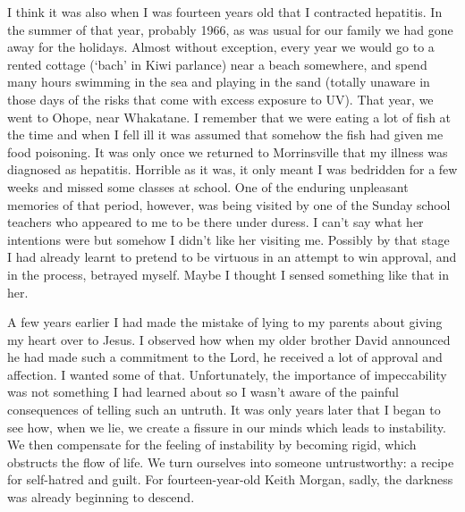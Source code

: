 \enlargethispage*{\baselineskip}

I think it was also when I was fourteen years old that I contracted
hepatitis. In the summer of that year, probably 1966, as was usual for
our family we had gone away for the holidays. Almost without exception,
every year we would go to a rented cottage (`bach' in Kiwi parlance)
near a beach somewhere, and spend many hours swimming in the sea and
playing in the sand (totally unaware in those days of the risks that
come with excess exposure to UV). That year, we went to Ohope, near
Whakatane. I remember that we were eating a lot of fish at the time and
when I fell ill it was assumed that somehow the fish had given me food
poisoning. It was only once we returned to Morrinsville that my illness
was diagnosed as hepatitis. Horrible as it was, it only meant I was
bedridden for a few weeks and missed some classes at school. One of the
enduring unpleasant memories of that period, however, was being visited
by one of the Sunday school teachers who appeared to me to be there
under duress. I can't say what her intentions were but somehow I didn't
like her visiting me. Possibly by that stage I had already learnt to
pretend to be virtuous in an attempt to win approval, and in the
process, betrayed myself. Maybe I thought I sensed something like that
in her.

\enlargethispage*{\baselineskip}

A few years earlier I had made the mistake of lying to my parents about
giving my heart over to Jesus. I observed how when my older brother
David announced he had made such a commitment to the Lord, he received a
lot of approval and affection. I wanted some of that. Unfortunately, the
importance of impeccability was not something I had learned about so I
wasn't aware of the painful consequences of telling such an untruth. It
was only years later that I began to see how, when we lie, we create a
fissure in our minds which leads to instability. We then compensate for
the feeling of instability by becoming rigid, which obstructs the flow
of life. We turn ourselves into someone untrustworthy: a recipe for
self-hatred and guilt. For fourteen-year-old Keith Morgan, sadly, the
darkness was already beginning to descend.

